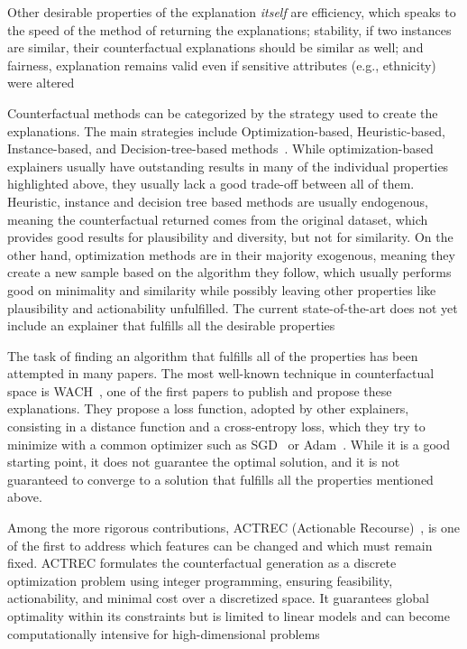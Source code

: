 \documentclass[12pt]{extarticle}
\numberwithin{equation}{section}
\begin{document}
Other desirable properties of the explanation \emph{itself} are
efficiency, which speaks to the speed of the method of returning the explanations; stability, if two instances are similar, their counterfactual explanations should be similar as well; and fairness, explanation remains valid even if sensitive attributes (e.g., ethnicity) were altered~\cite{guidotti2024counterfactual}

Counterfactual methods can be categorized by the strategy used to create the explanations. The main strategies include Optimization-based, Heuristic-based, Instance-based, and Decision-tree-based methods~\cite{guidotti2024counterfactual}. While optimization-based explainers usually have outstanding results in many of the individual properties highlighted above, they usually lack a good trade-off between all of them. Heuristic, instance and decision tree based methods are usually endogenous, meaning the counterfactual returned comes from the original dataset, which provides good results for plausibility and diversity, but not for similarity. On the other hand, optimization methods are in their majority exogenous, meaning they create a new sample based on the algorithm they follow, which usually performs good on minimality and similarity while possibly leaving other properties like plausibility and actionability unfulfilled. The current state-of-the-art does not yet include an explainer that fulfills all the desirable properties~\cite{guidotti2024counterfactual}

The task of finding an algorithm that fulfills all of the properties has been attempted in many papers. The most well-known technique in counterfactual space is WACH~\cite{wachter2017counterfactual}, one of the first papers to publish and propose these explanations. They propose a loss function, adopted by other explainers, consisting in a distance function and a cross-entropy loss, which they try to minimize with a common optimizer such as SGD~\cite{sgd} or Adam~\cite{adam}. While it is a good starting point, it does not guarantee the optimal solution, and it is not guaranteed to converge to a solution that fulfills all the properties mentioned above.

Among the more rigorous contributions, ACTREC (Actionable Recourse)~\cite{ustun2019actionable}, is one of the first to address which features can be changed and which must remain fixed. ACTREC formulates the counterfactual generation as a discrete optimization problem using integer programming, ensuring feasibility, actionability, and minimal cost over a discretized space. It guarantees global optimality within its constraints but is limited to linear models and can become computationally intensive for high-dimensional problems
\end{document}
